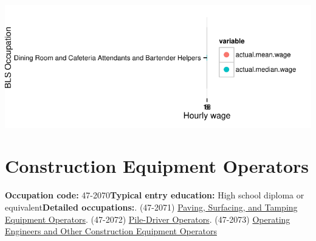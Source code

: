 \documentclass[a4paper,10pt]{article}\usepackage[]{graphicx}\usepackage[]{color}
\makeatletter
\def\maxwidth{ %
  \ifdim\Gin@nat@width>\linewidth
    \linewidth
  \else
    \Gin@nat@width
  \fi
}
\makeatother
\begin{document}
{\centering \includegraphics[width=\maxwidth]{figure/unnamed-chunk-283} 

}


\newpage\section{Construction Equipment Operators}\textbf{Occupation code:} 47-2070\newline\textbf{Typical entry education:} High school diploma or equivalent\newline\textbf{Detailed occupations:}. (47-2071)  \href{http://www.bls.gov/oes/current/oes472071.htm}{Paving, Surfacing, and Tamping Equipment Operators}. (47-2072)  \href{http://www.bls.gov/oes/current/oes472072.htm}{Pile-Driver Operators}. (47-2073)  \href{http://www.bls.gov/oes/current/oes472073.htm}{Operating Engineers and Other Construction Equipment Operators}\newline%
\end{document}
